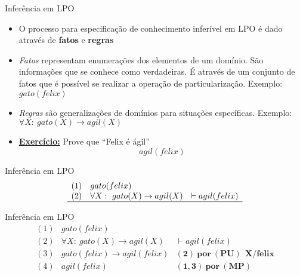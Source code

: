 \begin{frame}[t]{Inferência em LPO}	
	\begin{itemize}
	\item O processo para especificação de conhecimento inferível em LPO é dado através de {\bf fatos} e {\bf regras}

	\item {\it Fatos} representam enumerações dos elementos de um domínio. São informações que se conhece como verdadeiras. É através de um conjunto de fatos que é possível se realizar a operação de particularização. Exemplo: $gato(felix)$

	\item {\it Regras} são generalizações de domínios para situações específicas. Exemplo: $\forall X: ~ gato(X) \rightarrow agil(X)$

	\item {\bf \underline{Exercício:}} Prove que ``Felix é ágil'' $$agil(felix)$$
	\end{itemize}
\end{frame}

\begin{frame}[t]{Inferência em LPO}	
	$$\begin{array}{lll}
	(1) & gato(felix) & \\
	(2) & \forall X: ~ gato(X) \rightarrow agil(X)  & \vdash agil(felix) \\
	\hline
	\end{array}$$	
\end{frame}


\begin{frame}[t]{Inferência em LPO}	
	$$\begin{array}{lll}
	(1) & gato(felix) & \\
	(2) & \forall X: ~ gato(X) \rightarrow agil(X)  & \vdash agil(felix) \\
	\hline
	(3) & gato(felix) \rightarrow agil(felix) &  \mathbf{(2)~por~(PU)~~X/felix} \\
	(4) & agil(felix) & \mathbf{(1,3)~por~(MP)} \\
	\end{array}$$	
\end{frame}


